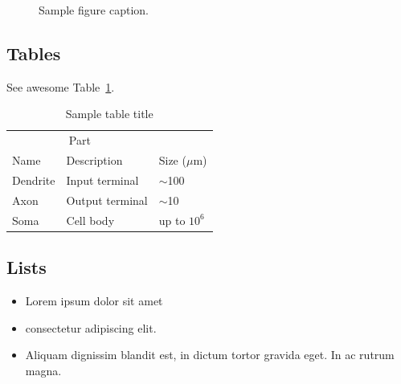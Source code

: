 \documentclass{article}
\begin{document}
\begin{figure}
  \centering
  \fbox{\rule[-.5cm]{4cm}{4cm} \rule[-.5cm]{4cm}{0cm}}
  \caption{Sample figure caption.}
  \label{fig:fig1}
\end{figure}

\subsection{Tables}
\lipsum[12]
See awesome Table~\ref{tab:table}.

\begin{table}
 \caption{Sample table title}
  \centering
  \begin{tabular}{lll}
    \toprule
    \multicolumn{2}{c}{Part}                   \\
    \cmidrule(r){1-2}
    Name     & Description     & Size ($\mu$m) \\
    \midrule
    Dendrite & Input terminal  & $\sim$100     \\
    Axon     & Output terminal & $\sim$10      \\
    Soma     & Cell body       & up to $10^6$  \\
    \bottomrule
  \end{tabular}
  \label{tab:table}
\end{table}

\subsection{Lists}
\begin{itemize}
\item Lorem ipsum dolor sit amet
\item consectetur adipiscing elit. 
\item Aliquam dignissim blandit est, in dictum tortor gravida eget. In ac rutrum magna.
\end{itemize}

\renewcommand\refname{參考文獻}

  
\end{document}
